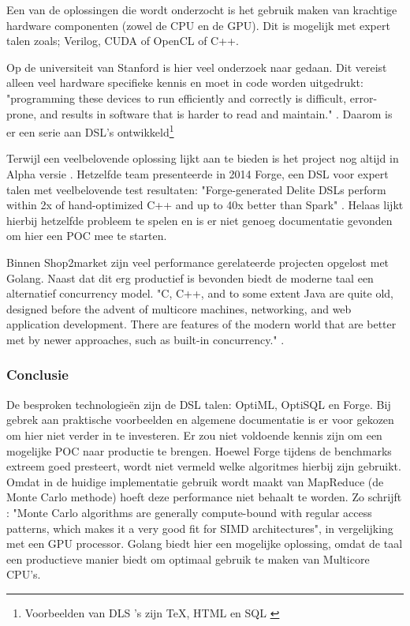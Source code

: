 Een van de oplossingen die wordt onderzocht is het gebruik maken van krachtige hardware componenten (zowel de CPU en de GPU). Dit is mogelijk met expert talen zoals; Verilog, CUDA of OpenCL of C++.


Op de universiteit van Stanford is hier veel onderzoek naar gedaan. Dit vereist alleen veel hardware specifieke kennis en moet in code worden uitgedrukt: "programming these devices to run efficiently and correctly is difficult, error-prone, and results in software that is harder to read and maintain." \parencite{sujeeth2011optiml}. Daarom is er een serie aan DSL's ontwikkeld\footnote{Voorbeelden van DLS 's zijn \TeX, HTML en SQL  \parencite{sigplan2000dsl}}

Terwijl \textcite{sujeeth2011optiml} een veelbelovende oplossing lijkt aan te bieden is het project nog altijd in Alpha versie \parencite{optiml_project_home}. Hetzelfde team presenteerde in 2014 Forge, een DSL voor expert talen met veelbelovende test resultaten: "Forge-generated Delite DSLs perform within 2x of hand-optimized C++ and up to 40x better than Spark" \parencite{sujeeth2014forge}. Helaas lijkt hierbij hetzelfde probleem te spelen en is er niet genoeg documentatie gevonden om hier een POC mee te starten.

Binnen Shop2market zijn veel performance gerelateerde projecten opgelost met Golang. Naast dat dit erg productief is bevonden biedt de moderne taal een alternatief concurrency model. "C, C++, and to some extent Java are quite old, designed before the advent of multicore machines, networking, and web application development. There are features of the modern world that are better met by newer approaches, such as built-in concurrency." \parencite{pike2012go}.

\subsubsection{\textbf{Conclusie}}

De besproken technologieën zijn de DSL talen: OptiML, OptiSQL en Forge. Bij gebrek aan praktische voorbeelden en algemene documentatie is er voor gekozen om hier niet verder in te investeren. Er zou niet voldoende kennis zijn om een mogelijke POC naar productie te brengen. Hoewel Forge tijdens de benchmarks extreem goed presteert, wordt niet vermeld welke algoritmes hierbij zijn gebruikt. Omdat in de huidige implementatie gebruik wordt maakt van MapReduce (de Monte Carlo methode) hoeft deze performance niet behaalt te worden. Zo schrijft \textcite{lee2010debunking}: "Monte Carlo algorithms are generally compute-bound with regular access patterns, which makes it a very good fit for SIMD architectures", in vergelijking met een GPU processor. Golang biedt hier een mogelijke oplossing, omdat de taal een productieve manier biedt om optimaal gebruik te maken van Multicore CPU's.

